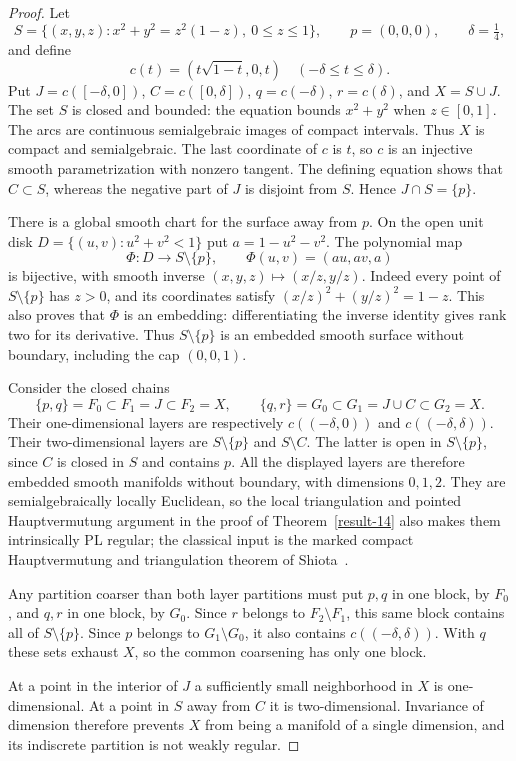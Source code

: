 \begin{proof}
Let
\[
 S=\{(x,y,z):x^2+y^2=z^2(1-z),\ 0\le z\le1\},
 \qquad p=(0,0,0),\qquad \delta=\tfrac14,
\]
and define
\[
 c(t)=(t\sqrt{1-t},0,t)\quad(-\delta\le t\le\delta).
\]
Put $J=c([-\delta,0])$, $C=c([0,\delta])$, $q=c(-\delta)$,
$r=c(\delta)$, and $X=S\cup J$.  The set $S$ is closed and bounded:
the equation bounds $x^2+y^2$ when $z\in[0,1]$.  The arcs are
continuous semialgebraic images of compact intervals.  Thus $X$ is
compact and semialgebraic.  The last coordinate of $c$ is $t$,
so $c$ is an injective smooth parametrization with nonzero tangent.
The defining equation shows that $C\subset S$, whereas the negative
part of $J$ is disjoint from $S$.  Hence $J\cap S=\{p\}$.

There is a global smooth chart for the surface away from $p$.
On the open unit disk $D=\{(u,v):u^2+v^2<1\}$ put $a=1-u^2-v^2$.
The polynomial map
\[
 \Phi:D\longrightarrow S\setminus\{p\},\qquad
 \Phi(u,v)=(au,av,a)
\]
is bijective, with smooth inverse $(x,y,z)\mapsto(x/z,y/z)$.
Indeed every point of $S\setminus\{p\}$ has $z>0$, and its
coordinates satisfy $(x/z)^2+(y/z)^2=1-z$.  This also proves that
$\Phi$ is an embedding: differentiating the inverse identity gives
rank two for its derivative.  Thus $S\setminus\{p\}$ is an embedded
smooth surface without boundary, including the cap $(0,0,1)$.

Consider the closed chains
\[
 \{p,q\}=F_0\subset F_1=J\subset F_2=X,
 \qquad
 \{q,r\}=G_0\subset G_1=J\cup C\subset G_2=X.
\]
Their one-dimensional layers are respectively
$c((-\delta,0))$ and $c((-\delta,\delta))$.  Their
two-dimensional layers are $S\setminus\{p\}$ and $S\setminus C$.
The latter is open in $S\setminus\{p\}$, since $C$ is closed in
$S$ and contains $p$.  All the displayed layers are therefore
embedded smooth manifolds without boundary, with dimensions $0,1,2$.
They are semialgebraically locally Euclidean, so the local
triangulation and pointed Hauptvermutung argument in the proof of
Theorem~\ref{result-14} also makes them intrinsically PL regular;
the classical input is the marked compact Hauptvermutung and
triangulation theorem of Shiota~\cite[Theorems~2.1--2.2, pp.~5--6]{Shiota2010}.

Any partition coarser than both layer partitions must put $p,q$ in
one block, by $F_0$, and $q,r$ in one block, by $G_0$.  Since $r$
belongs to $F_2\setminus F_1$, this same block contains all of
$S\setminus\{p\}$.  Since $p$ belongs to $G_1\setminus G_0$, it
also contains $c((-\delta,\delta))$.  With $q$ these sets exhaust
$X$, so the common coarsening has only one block.

At a point in the interior of $J$ a sufficiently small neighborhood
in $X$ is one-dimensional.  At a point in $S$ away from $C$ it is
two-dimensional.  Invariance of dimension
\cite[Theorem~2.26, p.~126]{Hatcher2002Algebraic} therefore prevents
$X$ from being a manifold of a single dimension, and its indiscrete
partition is not weakly regular.
\end{proof}

